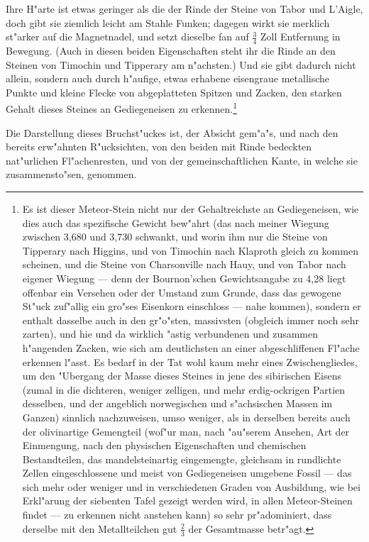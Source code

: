 \documentclass[a4paper, 11pt, oneside, german]{article}
\begin{document}
Ihre H"arte ist etwas geringer als die der Rinde der Steine von Tabor und L'Aigle, doch gibt sie ziemlich leicht am Stahle Funken; dagegen wirkt sie merklich st"arker auf die Magnetnadel, und setzt dieselbe fan auf $\frac{3}{4}$ Zoll Entfernung in Bewegung. (Auch in diesen beiden Eigenschaften steht ihr die Rinde an den Steinen von Timochin und Tipperary am n"achsten.) Und sie gibt dadurch nicht allein, sondern auch durch h"aufige, etwas erhabene eisengraue metallische Punkte und kleine Flecke von abgeplatteten Spitzen und Zacken, den starken Gehalt dieses Steines an Gediegeneisen zu erkennen.\footnote{Es ist dieser Meteor-Stein nicht nur der Gehaltreichste an Gediegeneisen, wie dies auch das spezifische Gewicht bew"ahrt (das nach meiner Wiegung zwischen 3,680 und 3,730 schwankt, und worin ihm nur die Steine von Tipperary nach Higgins, und von Timochin nach Klaproth gleich zu kommen scheinen, und die Steine von Charsonville nach Hauy, und von Tabor nach eigener Wiegung --- denn der Bournon'schen Gewichtsangabe zu 4,28 liegt offenbar ein Versehen oder der Umstand zum Grunde, dass das gewogene St"uck zuf"allig ein gro"ses Eisenkorn einschloss --- nahe kommen), sondern er enthalt dasselbe auch in den gr"o"sten, massivsten (obgleich immer noch sehr zarten), und hie und da wirklich "astig verbundenen und zusammen h"angenden Zacken, wie sich am deutlichsten an einer abgeschliffenen Fl"ache erkennen l"asst. Es bedarf in der Tat wohl kaum mehr eines Zwischengliedes, um den "Ubergang der Masse dieses Steines in jene des sibirischen Eisens (zumal in die dichteren, weniger zelligen, und mehr erdig-ockrigen Partien desselben, und der angeblich norwegischen und s"achsischen Massen im Ganzen) sinnlich nachzuweisen, umso weniger, als in derselben bereits auch der olivinartige Gemengteil (wof"ur man, nach "au"serem Ansehen, Art der Einmengung, nach den physischen Eigenschaften und chemischen Bestandteilen, das mandelsteinartig eingemengte, gleichsam in rundlichte Zellen eingeschlossene und meist von Gediegeneisen umgebene Fossil --- das sich mehr oder weniger und in verschiedenen Graden von Ausbildung, wie bei Erkl"arung der siebenten Tafel gezeigt werden wird, in allen Meteor-Steinen findet --- zu erkennen nicht anstehen kann) so sehr pr"adominiert, dass derselbe mit den Metallteilchen gut $\frac{2}{3}$ der Gesamtmasse betr"agt.} 

Die Darstellung dieses Bruchst"uckes ist, der Absicht gem"a"s, und nach den bereits erw"ahnten R"ucksichten, von den beiden mit Rinde bedeckten nat"urlichen Fl"achenresten, und von der gemeinschaftlichen Kante, in welche sie zusammensto"sen, genommen.
\end{document}
